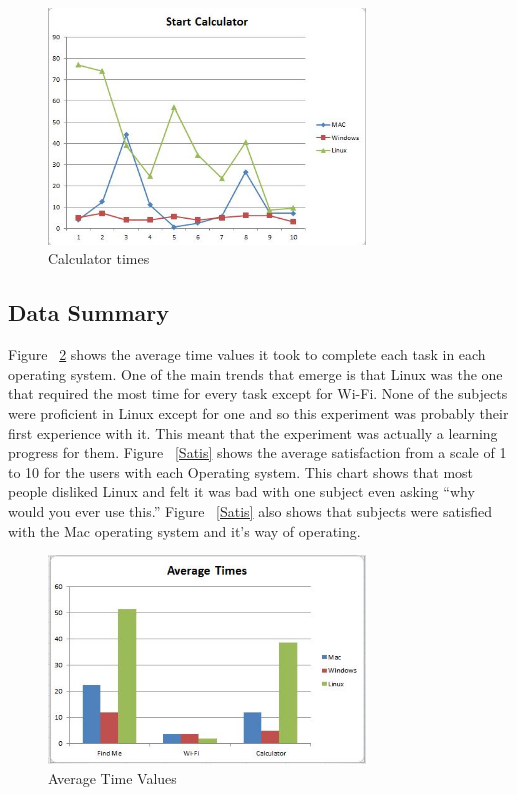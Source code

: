 \documentclass[11pt]{article}
\begin{document}
\begin{figure}[h!]
  \centering
    \includegraphics[width=0.75\textwidth]{./Images/Calculator}
  \caption{Calculator times}
 \label{Calc}
\end{figure}



\subsection{Data Summary}
Figure ~\ref{Average} shows the average time values it took to complete each task in each operating system. One of the main trends that emerge is that Linux was the one that required the most time for every task except for Wi-Fi. None of the subjects were proficient in Linux except for one and so this experiment was probably their first experience with it. This meant that the experiment was actually a learning progress for them. Figure ~\ref{Satis} shows the average satisfaction from a scale of 1 to 10 for the users with each Operating system. This chart shows that most people disliked Linux and felt it was bad with one subject even asking “why would you ever use this.” Figure ~\ref{Satis} also shows that subjects were satisfied with the Mac operating system and it's way of operating.

\begin{figure}[h!]
  \centering
    \includegraphics[width=0.75\textwidth]{./Images/Average_Times}
  \caption{Average Time Values}
 \label{Average}
\end{figure}
\end{document}
